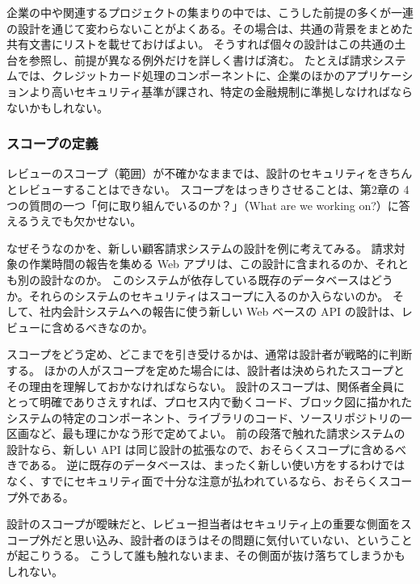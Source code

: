 \documentclass[uplatex]{jsarticle}
\def\label#1{}%
\begin{document}
企業の中や関連するプロジェクトの集まりの中では、こうした前提の多くが一連の設計を通じて変わらないことがよくある。その場合は、共通の背景をまとめた共有文書にリストを載せておけばよい。
そうすれば個々の設計はこの共通の土台を参照し、前提が異なる例外だけを詳しく書けば済む。
たとえば請求システムでは、クレジットカード処理のコンポーネントに、企業のほかのアプリケーションより高いセキュリティ基準が課され、特定の金融規制に準拠しなければならないかもしれない。

\subsubsection{スコープの定義}\label{subsec:ch6-defining-scope}

レビューのスコープ（範囲）が不確かなままでは、設計のセキュリティをきちんとレビューすることはできない。
スコープをはっきりさせることは、第2章の 4つの質問の一つ「何に取り組んでいるのか？」（What are we working on?）に答えるうえでも欠かせない。

\begin{exa}[新しい顧客請求システムのスコープ]\label{exa:ch6-billing-scope}
なぜそうなのかを、新しい顧客請求システムの設計を例に考えてみる。
請求対象の作業時間の報告を集める Web アプリは、この設計に含まれるのか、それとも別の設計なのか。
このシステムが依存している既存のデータベースはどうか。それらのシステムのセキュリティはスコープに入るのか入らないのか。
そして、社内会計システムへの報告に使う新しい Web ベースの API の設計は、レビューに含めるべきなのか。
\end{exa}

スコープをどう定め、どこまでを引き受けるかは、通常は設計者が戦略的に判断する。
ほかの人がスコープを定めた場合には、設計者は決められたスコープとその理由を理解しておかなければならない。
設計のスコープは、関係者全員にとって明確でありさえすれば、プロセス内で動くコード、ブロック図に描かれたシステムの特定のコンポーネント、ライブラリのコード、ソースリポジトリの一区画など、最も理にかなう形で定めてよい。
前の段落で触れた請求システムの設計なら、新しい API は同じ設計の拡張なので、おそらくスコープに含めるべきである。
逆に既存のデータベースは、まったく新しい使い方をするわけではなく、すでにセキュリティ面で十分な注意が払われているなら、おそらくスコープ外である。

設計のスコープが曖昧だと、レビュー担当者はセキュリティ上の重要な側面をスコープ外だと思い込み、設計者のほうはその問題に気付いていない、ということが起こりうる。
こうして誰も触れないまま、その側面が抜け落ちてしまうかもしれない。
\end{document}
